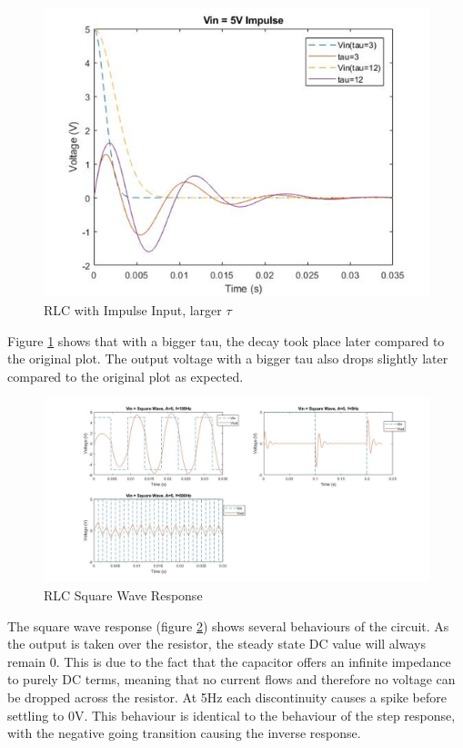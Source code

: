 \documentclass[11pt, oneside, titlepage]{article}   	%
\begin{document}
\begin{figure}[H]
\center
\includegraphics[scale = 0.5]{exercise3_5}
\caption{RLC with Impulse Input, larger $\tau$} \label{fig:ex3_5}
\end{figure}

Figure \ref{fig:ex3_5} shows that with a bigger tau, the decay took place later compared to the original plot. The output voltage with a bigger tau also drops slightly later compared to the original plot as expected. 

\begin{figure}[H]
\center
\includegraphics[scale = 0.35]{exercise3_6}
\caption{RLC Square Wave Response} \label{fig:ex3_6}
\end{figure}

The square wave response (figure \ref{fig:ex3_6}) shows several behaviours of the circuit. As the output is taken over the resistor, the steady state DC value will always remain 0. This is due to the fact that the capacitor offers an infinite impedance to purely DC terms, meaning that no current flows and therefore no voltage can be dropped across the resistor. 
At 5Hz each discontinuity causes a spike before settling to 0V. This behaviour is identical to the behaviour of the step response, with the negative going transition causing the inverse response.
\end{document}
